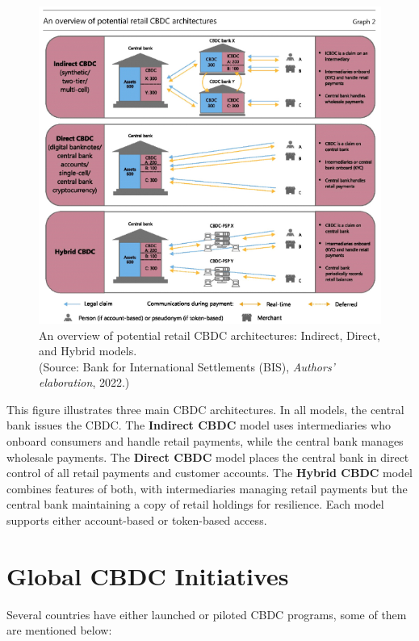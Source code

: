 \begin{figure}[H]
    \centering
    \includegraphics[width=1.0\linewidth]{Figure/chp2/image3.png} %
    \caption{An overview of potential retail CBDC architectures: Indirect, Direct, and Hybrid models. \\
    (Source: Bank for International Settlements (BIS), \textit{Authors’ elaboration}, 2022.)}
    \label{fig:1}
\end{figure}

\noindent
This figure illustrates three main CBDC architectures. In all models, the central bank issues the CBDC. The \textbf{Indirect CBDC} model uses intermediaries who onboard consumers and handle retail payments, while the central bank manages wholesale payments. The \textbf{Direct CBDC} model places the central bank in direct control of all retail payments and customer accounts. The \textbf{Hybrid CBDC} model combines features of both, with intermediaries managing retail payments but the central bank maintaining a copy of retail holdings for resilience. Each model supports either account-based or token-based access.

\section{Global CBDC Initiatives}
Several countries have either launched or piloted CBDC programs, some of them are mentioned below:

